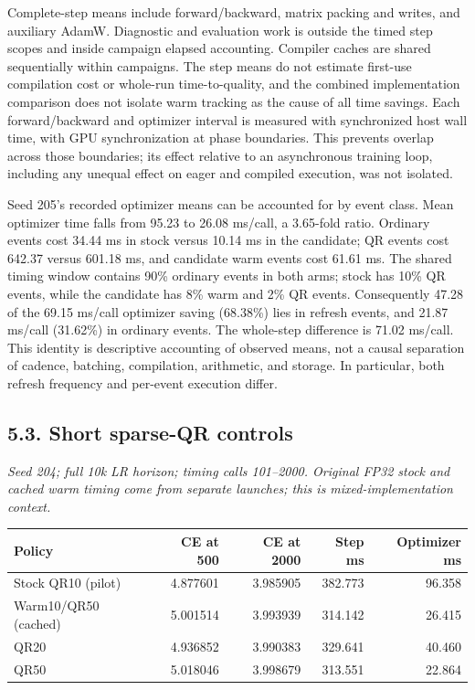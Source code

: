 \documentclass[
  10pt,
]{article}
\begin{document}
Complete-step means include forward/backward, matrix packing and writes,
and auxiliary AdamW. Diagnostic and evaluation work is outside the timed
step scopes and inside campaign elapsed accounting. Compiler caches are
shared sequentially within campaigns. The step means do not estimate
first-use compilation cost or whole-run time-to-quality, and the
combined implementation comparison does not isolate warm tracking as the
cause of all time savings. Each forward/backward and optimizer interval
is measured with synchronized host wall time, with GPU synchronization
at phase boundaries. This prevents overlap across those boundaries; its
effect relative to an asynchronous training loop, including any unequal
effect on eager and compiled execution, was not isolated.

Seed 205's recorded optimizer means can be accounted for by event class.
Mean optimizer time falls from 95.23 to 26.08 ms/call, a 3.65-fold
ratio. Ordinary events cost 34.44 ms in stock versus 10.14 ms in the
candidate; QR events cost 642.37 versus 601.18 ms, and candidate warm
events cost 61.61 ms. The shared timing window contains 90\% ordinary
events in both arms; stock has 10\% QR events, while the candidate has
8\% warm and 2\% QR events. Consequently 47.28 of the 69.15 ms/call
optimizer saving (68.38\%) lies in refresh events, and 21.87 ms/call
(31.62\%) in ordinary events. The whole-step difference is 71.02
ms/call. This identity is descriptive accounting of observed means, not
a causal separation of cadence, batching, compilation, arithmetic, and
storage. In particular, both refresh frequency and per-event execution
differ.

\hypertarget{short-sparse-qr-controls}{%
\subsection{5.3. Short sparse-QR
controls}\label{short-sparse-qr-controls}}

\begin{minipage}{\linewidth}

\emph{Seed 204; full 10k LR horizon; timing calls 101--2000. Original
FP32 stock and cached warm timing come from separate launches; this is
mixed-implementation context.}

\begin{center}
\begin{tabular}{@{}lrrrr@{}}
\toprule\noalign{}
Policy & CE at 500 & CE at 2000 & Step ms & Optimizer ms \\
\midrule\noalign{}
Stock QR10 (pilot) & 4.877601 & 3.985905 & 382.773 & 96.358 \\
Warm10/QR50 (cached) & 5.001514 & 3.993939 & 314.142 & 26.415 \\
QR20 & 4.936852 & 3.990383 & 329.641 & 40.460 \\
QR50 & 5.018046 & 3.998679 & 313.551 & 22.864 \\
\bottomrule
\end{tabular}
\end{center}

\end{minipage}
\end{document}

